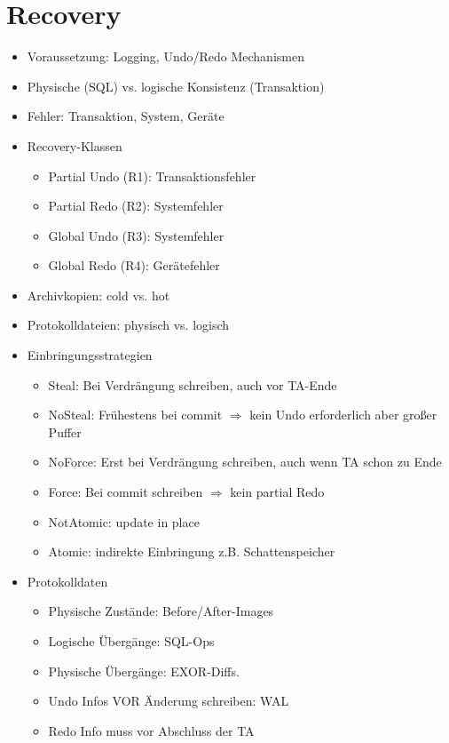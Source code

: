 \documentclass[11pt, paper=a4, twocolumn]{scrartcl}
\begin{document}
	\section{Recovery}
		\begin{itemize}
			\item Voraussetzung: Logging, Undo/Redo Mechanismen
			\item Physische (SQL) vs. logische Konsistenz (Transaktion)
			\item Fehler: Transaktion, System, Geräte
			\item Recovery-Klassen
				\begin{itemize}
					\item Partial Undo (R1): Transaktionsfehler
					\item Partial Redo (R2): Systemfehler
					\item Global Undo (R3): Systemfehler
					\item Global Redo (R4): Gerätefehler
				\end{itemize}
			\item Archivkopien: cold vs. hot
			\item Protokolldateien: physisch vs. logisch
			\item Einbringungsstrategien
				\begin{itemize}
					\item Steal: Bei Verdrängung schreiben, auch vor 
						TA-Ende
					\item NoSteal: Frühestens bei commit $\Rightarrow$ 
						kein Undo erforderlich aber großer Puffer
					\item NoForce: Erst bei Verdrängung schreiben, 
						auch wenn TA schon zu Ende
					\item Force: Bei commit schreiben $\Rightarrow$ 
						kein partial Redo
					\item NotAtomic: update in place
					\item Atomic: indirekte Einbringung z.B. 
						Schattenspeicher
				\end{itemize}
			\item Protokolldaten
				\begin{itemize}
					\item Physische Zustände: Before/After-Images
					\item Logische Übergänge: SQL-Ops
					\item Physische Übergänge: EXOR-Diffs.
					\item Undo Infos VOR Änderung schreiben: WAL
					\item Redo Info muss vor Abschluss der TA 

\end{itemize}
\end{itemize}
\end{document}
